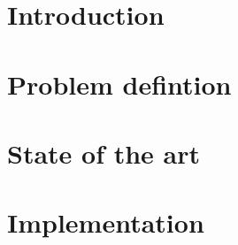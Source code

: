 






\chapter{Introduction}



\chapter{Problem defintion}


\chapter{State of the art}


\chapter{Implementation}



 



